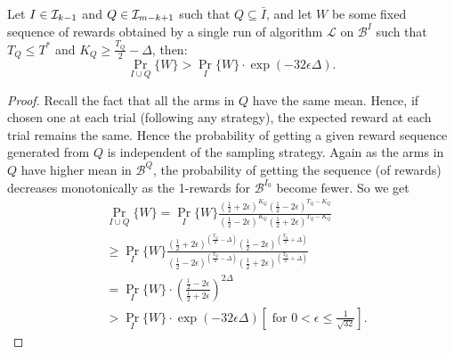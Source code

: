 \begin{lemma}\label{lem:lb1}
 Let $I \in \mathcal{I}_{k-1}$ and $Q \in \mathcal{I}_{m-k+1}$ such that $Q \subseteq \bar{I}$,
 and let $W$ be some fixed sequence of rewards
 obtained by a single run of algorithm $\mathcal{L}$ on $\mathcal{B}^{I}$ such
 that $T_{Q} \leq T^*$  and $K_{Q} \geq \frac{T_{Q}}{2} - \Delta$, then:
 \begin{equation}
  \Pr_{I \cup Q}\{W\} > \Pr_{I}\{W\}\cdot \exp(-32\epsilon\Delta).
 \end{equation}
\end{lemma}
\begin{proof}
Recall the fact that  all the arms in $Q$ have the same mean. Hence, if chosen
one at each trial (following any strategy), the expected reward at each trial
remains the same. Hence the probability of getting a given reward sequence generated from $Q$
is independent of the sampling strategy.
Again as the arms in
$Q$ have higher mean in $\mathcal{B}^{Q}$, the probability of getting
the sequence (of rewards) decreases monotonically as the 1-rewards for $\mathcal{B}^{I_0}$ become fewer.
So we get
\begin{align}
& \Pr_{I \cup Q}\{W\}  =  \Pr_{I}\{W\} \frac{\left(\frac{1}{2} + 2\epsilon\right)^{K_{Q}} \left(\frac{1}{2} - 2\epsilon\right)^{T_{Q}-K_{Q}}}{\left(\frac{1}{2} - 2\epsilon\right)^{K_{Q}} \left(\frac{1}{2} + 2\epsilon\right)^{T_{Q}-K_{Q}}} \nonumber\\
& \geq \Pr_{I}\{W\} \frac{\left(\frac{1}{2} + 2\epsilon\right)^{\left(\frac{T_{Q}}{2}-\Delta\right)} \left(\frac{1}{2} - 2\epsilon\right)^{\left(\frac{T_{Q}}{2}+\Delta\right)}}{\left(\frac{1}{2} - 2\epsilon\right)^{\left(\frac{T_{Q}}{2}-\Delta\right)} \left(\frac{1}{2} + 2\epsilon\right)^{\left(\frac{T_{Q}}{2}+\Delta\right)}} \nonumber\\
& = \Pr_{I}\{W\}\cdot \left(\frac{\frac{1}{2} - 2\epsilon}{\frac{1}{2} + 2\epsilon}\right)^{2\Delta} \nonumber\\
& >  \Pr_{I}\{W\}\cdot \exp(-32\epsilon\Delta) \left[\text{ for } 0 < \epsilon \leq \frac{1}{\sqrt{32}}\right]\nonumber.
\end{align}
\end{proof}

